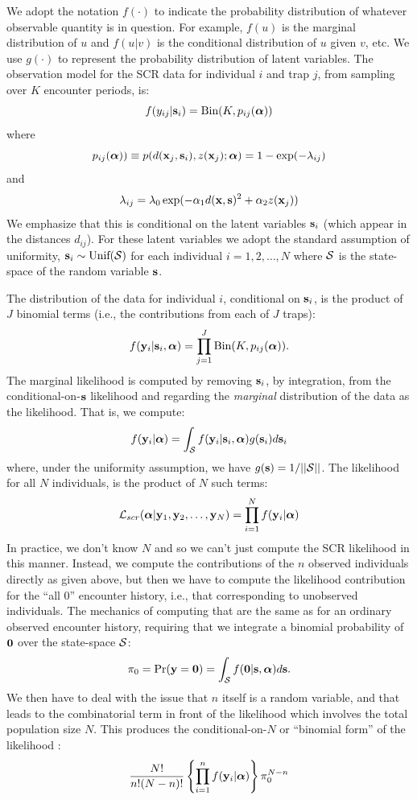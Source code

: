 \documentclass[12pt]{article}
\begin{document}
We adopt the notation $f(\cdot)$ to indicate the probability
distribution of whatever observable quantity is in question.
For example, $f(u)$ is
the marginal distribution of $u$ and $f(u|v)$ is the conditional
distribution of $u$ given $v$, etc. We use $g(\cdot)$ to represent the
probability distribution of latent variables.
The observation model for the SCR data for individual $i$ and trap $j$,
from sampling over $K$ encounter periods, is:
\begin{equation}
f(y_{ij}| {\bf s}_{i}) = \mbox{Bin}(K, p_{ij}({\bm \alpha}))
\label{rsf.mle.eq.cond-on-s}
\end{equation}
where
\[
p_{ij}({\bm \alpha})) \equiv  p(d({\bf x}_{j},{\bf s}_{i}), z({\bf x}_{j}); {\bm \alpha})
 = 1-\exp(- \lambda_{ij} )
\]
and
\[
 \lambda_{ij} = \lambda_{0} \exp(- \alpha_{1}
d({\bf x},{\bf s})^{2}
 + \alpha_{2} z({\bf x}_{j}) )
\]
We emphasize that this is conditional on the latent variables ${\bf
  s}_{i}$ (which appear in the distances $d_{ij}$). For these latent variables we
adopt the standard assumption of uniformity, ${\bf s}_{i} \sim
\mbox{Unif}({\cal S})$ for each individual $i=1,2,\ldots,N$
\citep{royle_young:2008} where ${\cal S}$ is the state-space of the
random variable ${\bf s}$.

The distribution of the data for
individual $i$, conditional on ${\bf s}_{i}$, is the product of $J$
binomial terms (i.e., the contributions from each of $J$ traps):
\[
  f({\bf y}_{i} | {\bf s}_{i} , {\bm \alpha}) =
  \prod_{j=1}^{J} \mbox{Bin}(K, p_{ij} ( {\bm \alpha})).
\]
The marginal likelihood \citep{borchers_efford:2008} is
computed by removing ${\bf s}_{i}$, by integration, from the
conditional-on-${\bf s}$ likelihood and regarding the {\it marginal}
distribution of the data as the likelihood. That is, we compute:
\[
  f({\bf y}_{i}|{\bm \alpha}) =
\int_{{\cal S}}  f( {\bf y}_{i} |{\bf s}_{i},{\bm \alpha}) g({\bf s}_{i}) d{\bf s}_{i}
\]
 where, under the uniformity assumption, we have
$g({\bf s}) = 1/||{\cal S}||$.
The likelihood for all $N$ individuals,
is the product of $N$ such terms:
\[
{\cal L}_{scr}({\bm \alpha} | {\bf y}_{1},{\bf y}_{2},\ldots, {\bf y}_{N}) = \prod_{i=1}^{N}
f({\bf y}_{i}|{\bm \alpha})
\]
In practice, we don't know $N$ and so we can't just compute the SCR
likelihood in this manner. Instead, we compute the contributions of
the $n$ observed individuals 
directly as given above, but then we have
to compute the likelihood contribution for the ``all 0'' encounter
history, i.e., that corresponding to unobserved individuals.  The
mechanics of computing that are the same as for an ordinary observed
encounter history, requiring that we integrate a binomial probability
of ${\bf 0}$ over the state-space ${\cal S}$:
\[
\pi_{0} = \Pr({\bf y} = {\bf 0}) = \int_{{\cal S}}
  f({\bf 0} | {\bf s} , {\bm \alpha})  d{\bf s}.
\]
We
then have to deal with the issue that $n$ 
itself is a random variable,
and that leads to the combinatorial term in front of the likelihood
which involves the total population size $N$. This produces the
conditional-on-$N$ or ``binomial form'' of the likelihood
\citep{borchers_efford:2008,royle:2009}:
\[
\frac{N!}{n! (N-n)!}
\left\{ \prod_{i=1}^{n} f({\bf y}_{i}|{\bm \alpha}) \right\}
\pi_{0}^{N-n}
\]
\end{document}
